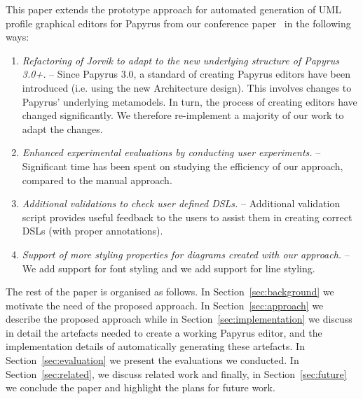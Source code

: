 This paper extends the prototype approach for automated generation of UML profile graphical editors for Papyrus from our conference paper~\cite{zolotas2018towards} in the following ways:
\begin{enumerate}
	\item \textit{Refactoring of \textit{Jorvik} to adapt to the new underlying structure of Papyrus 3.0+.} -- 
	Since Papyrus 3.0, a standard of creating Papyrus editors have been introduced (i.e. using the new Architecture design). 
	This involves changes to Papyrus' underlying metamodels. 
	In turn, the process of creating editors have changed significantly.
	We therefore re-implement a majority of our work to adapt the changes. 
	\item \textit{Enhanced experimental evaluations by conducting user experiments.} --
	Significant time has been spent on studying the efficiency of our approach, compared to the manual approach.
	\item \textit{Additional validations to check user defined DSLs.} -- Additional validation script provides useful feedback to the users to assist them in creating correct DSLs (with proper annotations).
	\item \textit{Support of more styling properties for diagrams created with our approach.} -- We add support for font styling and we add support for line styling.

\end{enumerate}
The rest of the paper is organised as follows. 
In Section~\ref{sec:background} we motivate the need of the proposed approach. 
In Section~\ref{sec:approach} we describe the proposed approach while 
in Section~\ref{sec:implementation} we discuss in detail the artefacts needed to create a working Papyrus editor, and the implementation details of automatically generating these artefacts. 
In Section~\ref{sec:evaluation} we present the evaluations we conducted.
In Section~\ref{sec:related}, we discuss related work and finally, in Section~\ref{sec:future} we conclude the paper and highlight the plans for future work.